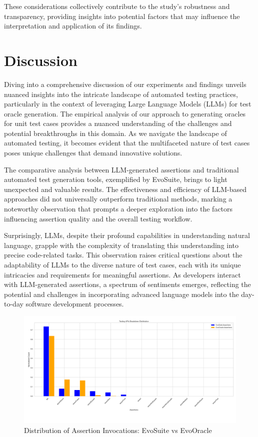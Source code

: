 These considerations collectively contribute to the study's robustness and transparency, providing insights into potential factors that may influence the interpretation and application of its findings.

\section{Discussion}
\label{sec:discussion}
\vspace{0.2 cm}

Diving into a comprehensive discussion of our experiments and findings unveils nuanced insights into the intricate landscape of automated testing practices, particularly in the context of leveraging Large Language Models (LLMs) for test oracle generation. The empirical analysis of our approach to generating oracles for unit test cases provides a nuanced understanding of the challenges and potential breakthroughs in this domain. As we navigate the landscape of automated testing, it becomes evident that the multifaceted nature of test cases poses unique challenges that demand innovative solutions.

The comparative analysis between LLM-generated assertions and traditional automated test generation tools, exemplified by EvoSuite, brings to light unexpected and valuable results. The effectiveness and efficiency of LLM-based approaches did not universally outperform traditional methods, marking a noteworthy observation that prompts a deeper exploration into the factors influencing assertion quality and the overall testing workflow.

Surprisingly, LLMs, despite their profound capabilities in understanding natural language, grapple with the complexity of translating this understanding into precise code-related tasks. This observation raises critical questions about the adaptability of LLMs to the diverse nature of test cases, each with its unique intricacies and requirements for meaningful assertions. As developers interact with LLM-generated assertions, a spectrum of sentiments emerges, reflecting the potential and challenges in incorporating advanced language models into the day-to-day software development processes.

\begin{figure}[H]
\centering
\includegraphics[width=1\textwidth]{images/test_api_distribution.png}
\caption{Distribution of Assertion Invocations: EvoSuite vs EvoOracle}
\label{fig:assertion_distribution}
\end{figure}

